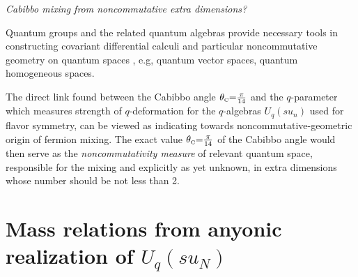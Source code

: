 \documentclass[twoside]{article}
\newcommand{\scr}{\rm\scriptscriptstyle}
\begin{document}
\begin{center}
{\it Cabibbo mixing from noncommutative extra dimensions?}
\end{center}

Quantum groups and the related quantum algebras provide
necessary tools in constructing covariant differential calculi and
particular noncommutative geometry on quantum spaces   \cite{frt},
e.g, quantum vector spaces, quantum homogeneous spaces.

The direct link found between the Cabibbo angle
$\theta_{\scr{C}}{=}\frac{\pi}{14}$ and the $q$-parameter which
measures strength of $q$-deformation for the $q$-algebras $U_q(su_n)$
used for flavor symmetry, can be viewed \cite{ARW} as indicating
towards noncommutative-geometric origin of fermion mixing. The exact
value $\theta_{\scr{C}}{=}\frac{\pi}{14}$ of the Cabibbo angle would
then serve as the {\it noncommutativity measure} of relevant quantum
space, responsible for the mixing and explicitly as yet unknown,
in extra dimensions whose number should be not less than 2.


\section{ Mass relations from anyonic realization of $U_q(su_N)$ }
\end{document}
